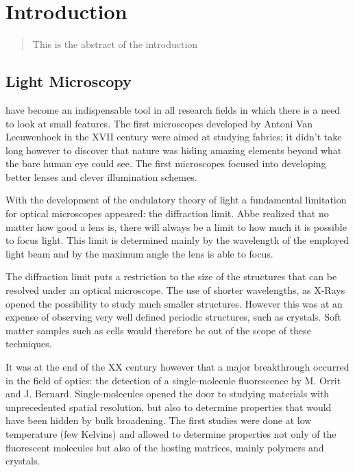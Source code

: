\chapter{Introduction}
\label{chapter_1}

\begin{abstract}
This is the abstract of the introduction
\end{abstract}

\newpage

\section{Light Microscopy}
 have become an indispensable tool in all research fields
in which there is a need to look at small features. The first microscopes
developed by Antoni Van Leeuwenhoek in the XVII century were aimed at studying
fabrics; it didn't take long however to discover that nature was hiding amazing
elements beyond what the bare human eye could see. The first microscopes focused
into developing better lenses and clever illumination schemes. 

With the development of the ondulatory theory of light a fundamental limitation
for optical microscopes appeared: the diffraction limit. Abbe realized that no
matter how good a lens is, there will always be a limit to how much it is
possible to focus light. This limit is determined mainly by the wavelength of
the employed light beam and by the maximum angle the lens is able to focus. 

The diffraction limit puts a restriction to the size of the structures that can
be resolved under an optical microscope. The use of shorter wavelengths, as
X-Rays opened the possibility to study much smaller structures. However this was
at an expense of observing very well defined periodic structures, such as
crystals. Soft matter samples such as cells would therefore be out of the scope
of these techniques. 

It was at the end of the XX century however that a major breakthrough occurred
in the field of optics: the detection of a single-molecule fluorescence by M.
Orrit and J. Bernard. Single-molecules opened the door to studying materials 
with unprecedented spatial resolution, but also to determine properties that
would have been hidden by bulk broadening. The first studies were done at low
temperature (few Kelvins) and allowed to determine properties not only of the
fluorescent molecules but also of the hosting matrices, mainly polymers and
crystals. 

